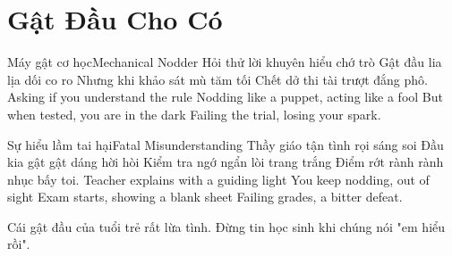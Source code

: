 \chapter{Gật Đầu Cho Có}

\begin{tutuyetbox}{Máy gật cơ học}{Mechanical Nodder}
Hỏi thử lời khuyên hiểu chớ trò
Gật đầu lia lịa dối co ro
Nhưng khi khảo sát mù tăm tối
Chết dở thi tài trượt đắng phô.
\tcblower
Asking if you understand the rule 
Nodding like a puppet, acting like a fool 
But when tested, you are in the dark 
Failing the trial, losing your spark.
\end{tutuyetbox}

\begin{tutuyetbox}{Sự hiểu lầm tai hại}{Fatal Misunderstanding}
Thầy giáo tận tình rọi sáng soi
Đầu kia gật gật dáng hời hòi
Kiểm tra ngớ ngẩn lòi trang trắng
Điểm rớt rành rành nhục bấy toi.
\tcblower
Teacher explains with a guiding light 
You keep nodding, out of sight 
Exam starts, showing a blank sheet 
Failing grades, a bitter defeat.
\end{tutuyetbox}

\begin{ghichu}
Cái gật đầu của tuổi trẻ rất lừa tình. Đừng tin học sinh khi chúng nói "em hiểu rồi".
\end{ghichu}